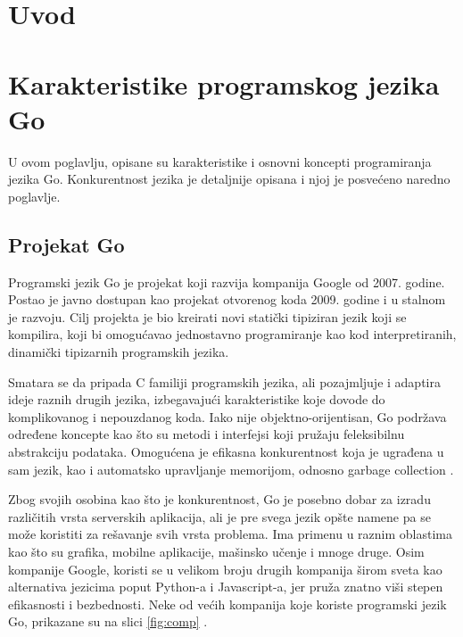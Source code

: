 \documentclass[12pt,oneside]{memoir}
\begin{document}
\frontmatter
\naslovna
\komisija
{}
\apstrakt
\tableofcontents*

\mainmatter

\chapter{Uvod}


\chapter{Karakteristike programskog jezika Go}

U ovom poglavlju, opisane su karakteristike i osnovni koncepti programiranja jezika Go.  Konkurentnost jezika je detaljnije opisana i njoj je posvećeno naredno poglavlje.

\section{Projekat Go}

Programski jezik Go je projekat koji razvija kompanija Google od 2007. godine. Postao je javno dostupan kao projekat otvorenog koda 2009. godine i u stalnom je razvoju. Cilj projekta je bio kreirati novi statički tipiziran jezik koji se kompilira, koji bi omogućavao jednostavno programiranje kao kod interpretiranih, dinamički tipizarnih programskih jezika. 

Smatara se da pripada C familiji programskih jezika, ali pozajmljuje i adaptira ideje raznih drugih jezika, izbegavajući karakteristike koje dovode do komplikovanog i nepouzdanog koda. Iako nije objektno-orijentisan, Go podržava određene koncepte kao što su metodi i interfejsi koji pružaju feleksibilnu abstrakciju podataka. Omogućena je efikasna konkurentnost koja je ugrađena u sam jezik, kao i automatsko upravljanje memorijom, odnosno garbage collection \cite{bookGoProg}. 

Zbog svojih osobina kao što je konkurentnost, Go je posebno dobar za izradu različitih vrsta serverskih aplikacija, ali je pre svega jezik opšte namene pa se može koristiti za rešavanje svih vrsta problema. Ima primenu u raznim oblastima kao što su grafika, mobilne aplikacije, mašinsko učenje i mnoge druge. Osim kompanije Google, koristi se u velikom broju drugih kompanija širom sveta kao alternativa jezicima poput Python-a i Javascript-a, jer pruža znatno viši stepen efikasnosti i bezbednosti. Neke od većih kompanija koje koriste programski jezik Go, prikazane su na slici \ref{fig:comp} \cite{goCompany}.
\end{document}

